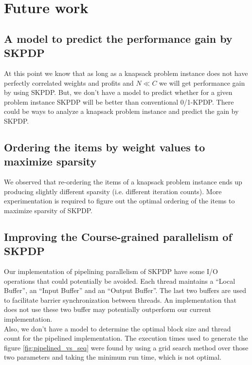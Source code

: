 \chapter{Future work}

\label{chap:future-work}


\section{A model to predict the performance gain by SKPDP}
At this point we know that as long as a knapsack problem instance does not have perfectly correlated weights and profits and $N \ll C$ we will get performance gain by using SKPDP. But, we don't have a model to predict whether for a given problem instance SKPDP will be better than conventional 0/1-KPDP. There could be ways to analyze a knapsack problem instance and predict the gain by SKPDP.

\section{Ordering the items by weight values to maximize sparsity}
We observed that re-ordering the items of a knapsack problem instance ends up producing slightly different sparsity (i.e. different iteration counts). More experimentation is required to figure out the optimal ordering of the items to maximize sparsity of SKPDP.

\section{Improving the Course-grained parallelism of SKPDP}
Our implementation of pipelining parallelism of SKPDP have some I/O operations that could potentially be avoided. Each thread maintains a ``Local Buffer'', an ``Input Buffer'' and an ``Output Buffer''. The last two buffers are used to facilitate barrier synchronization between threads. An implementation that does not use these two buffer may potentially outperform our current implementation.\\
Also, we don't have a model to determine the optimal block size and thread count for the pipelined implementation. The execution times used to generate the figure \ref{fig:pipelined_vs_seq} were found by using a grid search method over those two parameters and taking the minimum run time, which is not optimal.


